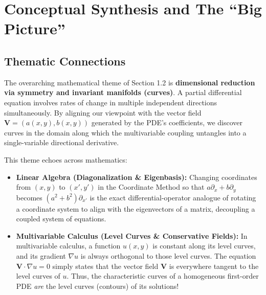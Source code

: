 \documentclass[11pt]{article}
\begin{document}
\newpage
\section{Conceptual Synthesis and The ``Big Picture''}

\subsection{Thematic Connections}
The overarching mathematical theme of Section 1.2 is \textbf{dimensional reduction via symmetry and invariant manifolds (curves)}. A partial differential equation involves rates of change in multiple independent directions simultaneously. By aligning our viewpoint with the vector field $\mathbf{V} = (a(x, y), b(x, y))$ generated by the PDE's coefficients, we discover curves in the domain along which the multivariable coupling untangles into a single-variable directional derivative.

This theme echoes across mathematics:
\begin{itemize}
    \item \textbf{Linear Algebra (Diagonalization \& Eigenbasis):} Changing coordinates from $(x, y)$ to $(x', y')$ in the Coordinate Method so that $a\partial_x + b\partial_y$ becomes $(a^2+b^2)\partial_{x'}$ is the exact differential-operator analogue of rotating a coordinate system to align with the eigenvectors of a matrix, decoupling a coupled system of equations.
    \item \textbf{Multivariable Calculus (Level Curves \& Conservative Fields):} In multivariable calculus, a function $u(x, y)$ is constant along its level curves, and its gradient $\nabla u$ is always orthogonal to those level curves. The equation $\mathbf{V} \cdot \nabla u = 0$ simply states that the vector field $\mathbf{V}$ is everywhere tangent to the level curves of $u$. Thus, the characteristic curves of a homogeneous first-order PDE \emph{are} the level curves (contours) of its solutions!
\end{itemize}
\end{document}
